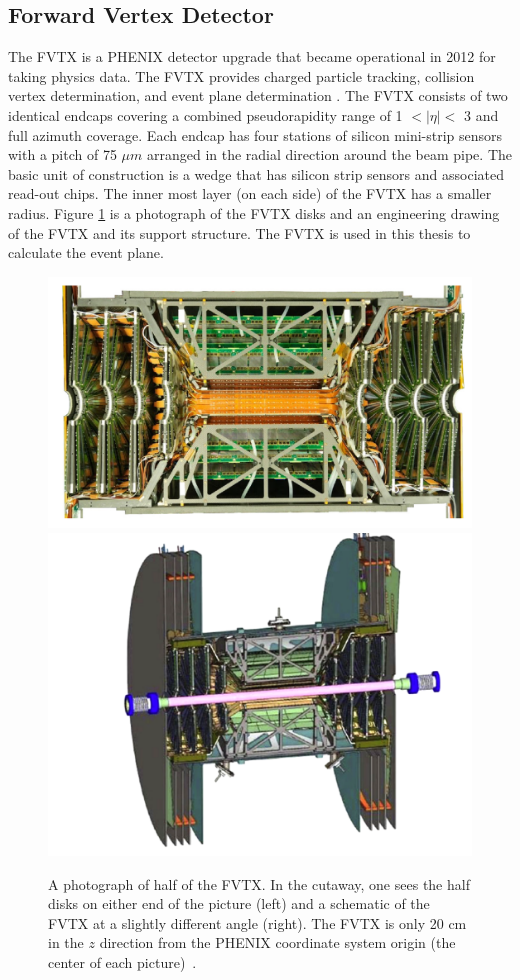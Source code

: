\subsection{Forward Vertex Detector}
The FVTX is a PHENIX detector upgrade that became operational in 2012 for taking physics data. The FVTX provides charged particle tracking, collision vertex determination, and event plane determination \cite{Aidala201444}. The FVTX consists of two identical endcaps covering a combined pseudorapidity range of 1 $<|\eta|<$ 3 and full azimuth coverage. Each endcap has four stations of silicon mini-strip sensors with a pitch of 75 $\mu m$ arranged in the radial direction around the beam pipe. The basic unit of construction is a wedge that has silicon strip sensors and associated read-out chips. The inner most layer (on each side) of the FVTX has a smaller radius. Figure \ref{fig:fvtx_cutaway} is a photograph of the FVTX disks and an engineering drawing of the FVTX and its support structure. The FVTX is used in this thesis to calculate the event plane.
\begin{figure}[h!]
\begin{center}
\includegraphics[width=0.45\linewidth]{figs/fvtx_cutaway.png}
\includegraphics[width=0.45\linewidth]{figs/fvtx_diagram.png}
\caption{A photograph of half of the FVTX. In the cutaway, one sees the half disks on either end of the picture (left) and a schematic of the FVTX at a slightly different angle (right). The FVTX is only 20 cm in the $z$ direction from the PHENIX coordinate system origin (the center of each picture)~\cite{Aidala201444}.}
\label{fig:fvtx_cutaway}
\end{center}
\end{figure}
